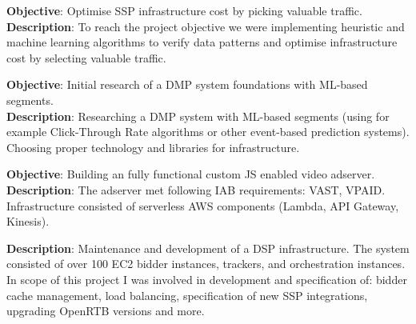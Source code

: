 \documentclass[11pt,a4paper,sans]{moderncv} %
\begin{document}
{\textbf{Objective}: Optimise SSP infrastructure cost by picking valuable traffic.\\
\textbf{Description}: To reach the project objective we were implementing heuristic and machine learning algorithms to verify data patterns and optimise infrastructure cost by selecting valuable traffic.
}

{\textbf{Objective}: Initial research of a DMP system foundations with ML-based segments.\\
\textbf{Description}: Researching a DMP system with ML-based segments (using for example Click-Through Rate algorithms or other event-based prediction systems). Choosing proper technology and libraries for infrastructure.
}

{\textbf{Objective}: Building an fully functional custom JS enabled video adserver.\\
\textbf{Description}: The adserver met following IAB requirements: VAST, VPAID. Infrastructure consisted of serverless AWS components (Lambda, API Gateway, Kinesis).
}

{\textbf{Description}: Maintenance and development of a DSP infrastructure. The system consisted of over 100 EC2 bidder instances, trackers, and orchestration instances. In scope of this project I was involved in development and specification of: bidder cache management, load balancing, specification of new SSP integrations, upgrading OpenRTB versions and more.
}


\clearpage
\makecvtitle{}
\end{document}
